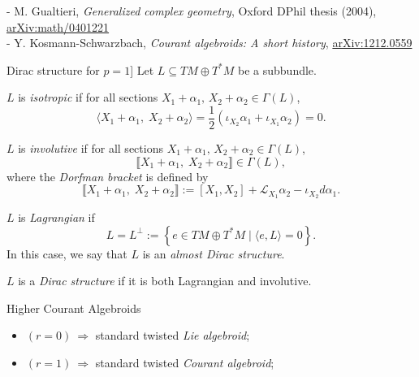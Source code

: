\documentclass[beamer,10pt,handout]{standalone}  \Handouttrue
\begin{document}
{- M. Gualtieri, \textit{Generalized complex geometry}, Oxford DPhil thesis (2004), \hyperref[https://arxiv.org/abs/math/0401221]{arXiv:math/0401221} \\
- Y. Kosmann-Schwarzbach, \textit{Courant algebroids: A short history}, \hyperref[https://arxiv.org/abs/1212.0559]{arXiv:1212.0559}
	\item Dirac structure for \texorpdfstring{$p = 1$}{p = 1}]
Let \( L \subseteq TM \oplus T^*M \) be a subbundle.
  \item \( L \) is \emph{isotropic} if for all sections \( X_1 + \alpha_1,\, X_2 + \alpha_2 \in \Gamma(L) \),
  \[
  \langle X_1 + \alpha_1,\; X_2 + \alpha_2 \rangle = \frac{1}{2}\left( \iota_{X_2} \alpha_1 + \iota_{X_1} \alpha_2 \right) = 0.
  \]

  \item \( L \) is \emph{involutive} if for all sections \( X_1 + \alpha_1,\, X_2 + \alpha_2 \in \Gamma(L) \),
  \[
  \llbracket X_1 + \alpha_1,\; X_2 + \alpha_2 \rrbracket \in \Gamma(L),
  \]
  where the \emph{Dorfman bracket} is defined by
  \[
  \llbracket X_1 + \alpha_1,\; X_2 + \alpha_2 \rrbracket := [X_1, X_2] + \mathcal{L}_{X_1}\alpha_2 - \iota_{X_2} d\alpha_1.
  \]

  \item \( L \) is \emph{Lagrangian} if
  \[
  L = L^\perp := \left\{ e \in TM \oplus T^*M \mid \langle e, L \rangle = 0 \right\}.
  \]
  In this case, we say that \( L \) is an \emph{almost Dirac structure}.

  \item \( L \) is a \emph{Dirac structure} if it is both Lagrangian and involutive.
}



\begin{frame}{Higher Courant Algebroids}
	\begin{defblock}
			
	\end{defblock}

	\begin{itemize}
		\item $(r=0) ~ \Rightarrow$ standard twisted \emph{Lie algebroid};
		\item $(r=1) ~ \Rightarrow$ standard twisted \emph{Courant algebroid};
	\end{itemize}

\end{frame}
\end{document}
